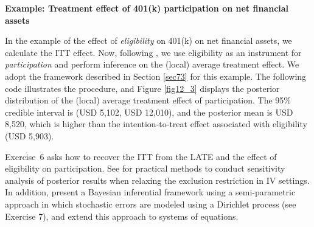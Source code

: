 \textbf{Example: Treatment effect of 401(k) participation on net financial assets}

In the example of the effect of \textit{eligibility} on 401(k) on net financial assets, we calculate the ITT effect. Now, following \cite{chernozhukov2004effects}, we use eligibility as an instrument for \textit{participation} and perform inference on the (local) average treatment effect. We adopt the framework described in Section \ref{sec73} for this example. The following code illustrates the procedure, and Figure \ref{fig12_3} displays the posterior distribution of the (local) average treatment effect of participation. The 95\% credible interval is (USD 5,102, USD 12,010), and the posterior mean is USD 8,520, which is higher than the intention-to-treat effect associated with eligibility (USD 5,903). 

Exercise~6 asks how to recover the ITT from the LATE and the effect of eligibility on participation. See \cite{Conley2012} for practical methods to conduct sensitivity analysis of posterior results when relaxing the exclusion restriction in IV settings. In addition, \cite{conley2008semi} present a Bayesian inferential framework using a semi-parametric approach in which stochastic errors are modeled using a Dirichlet process (see Exercise 7), and \cite{ramirez2024welfare} extend this approach to systems of equations.


